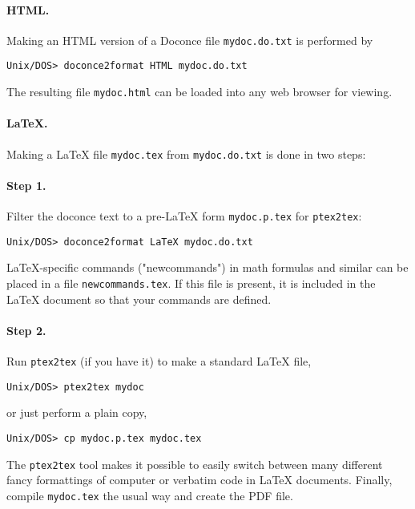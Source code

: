 \documentclass{article}
\begin{document}
\paragraph{HTML.}

Making an HTML version of a Doconce file {\fontsize{10pt}{10pt}\verb!mydoc.do.txt!}
is performed by
\begin{Verbatim}[fontsize=\fontsize{9pt}{9pt},tabsize=8,baselinestretch=0.85,
fontfamily=tt,xleftmargin=7mm]
Unix/DOS> doconce2format HTML mydoc.do.txt
\end{Verbatim}
\noindent
The resulting file {\fontsize{10pt}{10pt}\verb!mydoc.html!} can be loaded into any web browser for viewing.
\paragraph{LaTeX.}

Making a LaTeX file {\fontsize{10pt}{10pt}\verb!mydoc.tex!} from {\fontsize{10pt}{10pt}\verb!mydoc.do.txt!} is done in two steps:

\paragraph{Step 1.}
Filter the doconce text to a pre-LaTeX form {\fontsize{10pt}{10pt}\verb!mydoc.p.tex!} for
     {\fontsize{10pt}{10pt}\verb!ptex2tex!}:
\begin{Verbatim}[fontsize=\fontsize{9pt}{9pt},tabsize=8,baselinestretch=0.85,
fontfamily=tt,xleftmargin=7mm]
Unix/DOS> doconce2format LaTeX mydoc.do.txt
\end{Verbatim}
\noindent
LaTeX-specific commands ("newcommands") in math formulas and similar
can be placed in a file {\fontsize{10pt}{10pt}\verb!newcommands.tex!}. If this file is present,
it is included in the LaTeX document so that your commands are
defined.

\paragraph{Step 2.}
Run {\fontsize{10pt}{10pt}\verb!ptex2tex!} (if you have it) to make a standard LaTeX file,
\begin{Verbatim}[fontsize=\fontsize{9pt}{9pt},tabsize=8,baselinestretch=0.85,
fontfamily=tt,xleftmargin=7mm]
Unix/DOS> ptex2tex mydoc
\end{Verbatim}
\noindent
     or just perform a plain copy,
\begin{Verbatim}[fontsize=\fontsize{9pt}{9pt},tabsize=8,baselinestretch=0.85,
fontfamily=tt,xleftmargin=7mm]
Unix/DOS> cp mydoc.p.tex mydoc.tex
\end{Verbatim}
\noindent
The {\fontsize{10pt}{10pt}\verb!ptex2tex!} tool makes it possible to easily switch between many
different fancy formattings of computer or verbatim code in LaTeX
documents.
Finally, compile {\fontsize{10pt}{10pt}\verb!mydoc.tex!} the usual way and create the PDF file.
\end{document}
